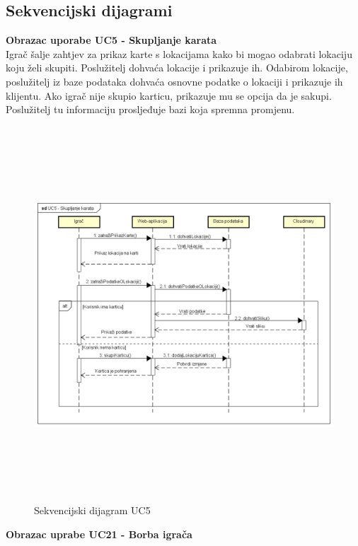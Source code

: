 					
				\eject		
				
			\subsection{Sekvencijski dijagrami}
			
				\textbf{Obrazac uporabe UC5 - Skupljanje karata}\\
					
					{Igrač šalje zahtjev za prikaz karte s lokacijama kako bi mogao odabrati lokaciju koju želi skupiti. Poslužitelj dohvaća lokacije i prikazuje ih. Odabirom lokacije, poslužitelj iz baze podataka dohvaća osnovne podatke o lokaciji i prikazuje ih klijentu. Ako igrač nije skupio karticu, prikazuje mu se opcija da je sakupi. Poslužitelj tu informaciju prosljeđuje bazi koja spremna promjenu.}\\
					
					\begin{figure}[H]
						\includegraphics[width=\linewidth, height=14cm]{dijagrami/sd_UC5}
						\centering
						\caption{Sekvencijski dijagram UC5}
						\label{}
					\end{figure}
				\newpage	
				
				\textbf{Obrazac uprabe UC21 - Borba igrača}
					
